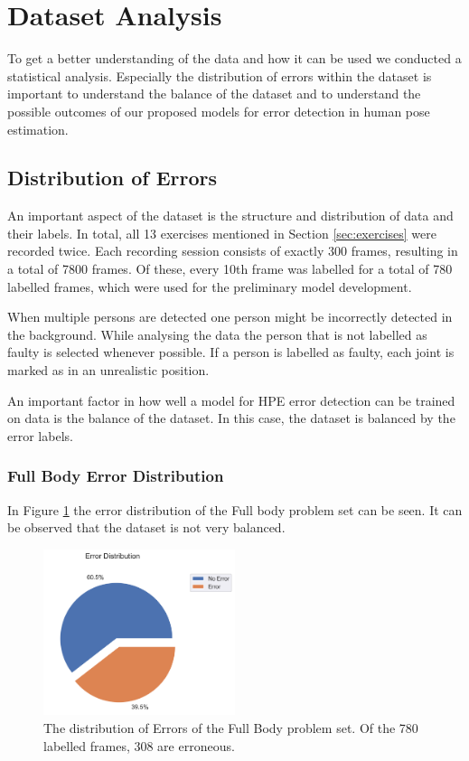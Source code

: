 \section{Dataset Analysis}
\label{sec:dataset}

To get a better understanding of the data and how it can be used we conducted a statistical analysis. Especially the distribution of errors within the dataset is important to understand the balance of the dataset and to understand the possible outcomes of our proposed models for error detection in human pose estimation.

\subsection{Distribution of Errors}

An important aspect of the dataset is the structure and distribution of data and their labels. In total, all 13 exercises mentioned in Section \ref{sec:exercises} were recorded twice. Each recording session consists of exactly 300 frames, resulting in a total of 7800 frames. Of these, every 10th frame was labelled for a total of 780 labelled frames, which were used for the preliminary model development.

When multiple persons are detected one person might be incorrectly detected in the background. While analysing the data the person that is not labelled as faulty is selected whenever possible. If a person is labelled as faulty, each joint is marked as in an unrealistic position.

An important factor in how well a model for HPE error detection can be trained on data is the balance of the dataset. In this case, the dataset is balanced by the error labels. 

\subsubsection{Full Body Error Distribution}

In Figure \ref{fig:fb_pie} the error distribution of the Full body problem set can be seen. It can be observed that the dataset is not very balanced.

\begin{figure}[ht]
  \centering
  \includegraphics[width=0.5\textwidth]{figures/Data/dist_full_body/Error_Distribution.png}
  \caption[Error Distribution of the Full Body]{The distribution of Errors of the Full Body problem set. Of the 780 labelled frames, 308 are erroneous.}
  \label{fig:fb_pie}
\end{figure}

